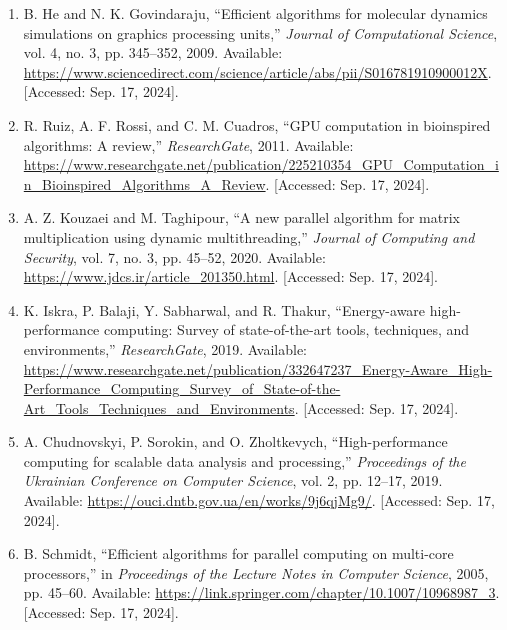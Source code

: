 \documentclass[a4paper,12pt]{extarticle}
\begin{document}
\begin{enumerate}
	\item B. He and N. K. Govindaraju, “Efficient algorithms for molecular dynamics simulations on graphics processing units,” \textit{Journal of Computational Science}, vol. 4, no. 3, pp. 345–352, 2009. Available: \url{https://www.sciencedirect.com/science/article/abs/pii/S016781910900012X}. [Accessed: Sep. 17, 2024].
	\item R. Ruiz, A. F. Rossi, and C. M. Cuadros, “GPU computation in bioinspired algorithms: A review,” \textit{ResearchGate}, 2011. Available: \url{https://www.researchgate.net/publication/225210354_GPU_Computation_in_Bioinspired_Algorithms_A_Review}. [Accessed: Sep. 17, 2024].
	\item A. Z. Kouzaei and M. Taghipour, “A new parallel algorithm for matrix multiplication using dynamic multithreading,” \textit{Journal of Computing and Security}, vol. 7, no. 3, pp. 45–52, 2020. Available: \url{https://www.jdcs.ir/article_201350.html}. [Accessed: Sep. 17, 2024].
	\item K. Iskra, P. Balaji, Y. Sabharwal, and R. Thakur, “Energy-aware high-performance computing: Survey of state-of-the-art tools, techniques, and environments,” \textit{ResearchGate}, 2019. Available: \url{https://www.researchgate.net/publication/332647237_Energy-Aware_High-Performance_Computing_Survey_of_State-of-the-Art_Tools_Techniques_and_Environments}. [Accessed: Sep. 17, 2024].
	\item A. Chudnovskyi, P. Sorokin, and O. Zholtkevych, “High-performance computing for scalable data analysis and processing,” \textit{Proceedings of the Ukrainian Conference on Computer Science}, vol. 2, pp. 12–17, 2019. Available: \url{https://ouci.dntb.gov.ua/en/works/9j6qjMg9/}. [Accessed: Sep. 17, 2024].
	\item B. Schmidt, “Efficient algorithms for parallel computing on multi-core processors,” in \textit{Proceedings of the Lecture Notes in Computer Science}, 2005, pp. 45–60. Available: \url{https://link.springer.com/chapter/10.1007/10968987_3}. [Accessed: Sep. 17, 2024].
\end{enumerate}
\end{document}
